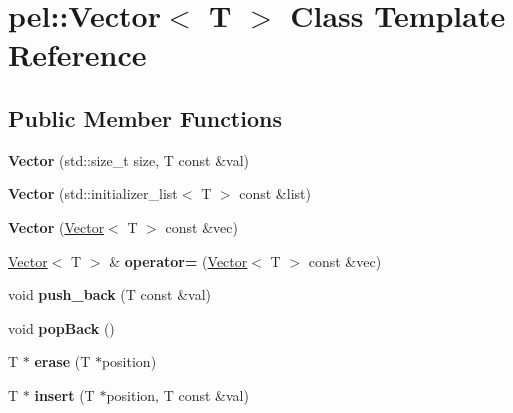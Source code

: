 \hypertarget{classpel_1_1Vector}{}\section{pel\+:\+:Vector$<$ T $>$ Class Template Reference}
\label{classpel_1_1Vector}
\subsection*{Public Member Functions}
\begin{DoxyCompactItemize}
\item 
\hypertarget{classpel_1_1Vector_acfca55ede1e52d9d559c87c1e6a7f4f0}{}{\bfseries Vector} (std\+::size\+\_\+t size, T const \&val)\label{classpel_1_1Vector_acfca55ede1e52d9d559c87c1e6a7f4f0}

\item 
\hypertarget{classpel_1_1Vector_a776cdcfda0eabf24d3cad2c57dee22e1}{}{\bfseries Vector} (std\+::initializer\+\_\+list$<$ T $>$ const \&list)\label{classpel_1_1Vector_a776cdcfda0eabf24d3cad2c57dee22e1}

\item 
\hypertarget{classpel_1_1Vector_ab8e71f6d59953f07233438634321600e}{}{\bfseries Vector} (\hyperlink{classpel_1_1Vector}{Vector}$<$ T $>$ const \&vec)\label{classpel_1_1Vector_ab8e71f6d59953f07233438634321600e}

\item 
\hypertarget{classpel_1_1Vector_a825f41c3a26e225eca6c904a22b1d193}{}\hyperlink{classpel_1_1Vector}{Vector}$<$ T $>$ \& {\bfseries operator=} (\hyperlink{classpel_1_1Vector}{Vector}$<$ T $>$ const \&vec)\label{classpel_1_1Vector_a825f41c3a26e225eca6c904a22b1d193}

\item 
\hypertarget{classpel_1_1Vector_aa05e5f15984153e3ee031f994604b72e}{}void {\bfseries push\+\_\+back} (T const \&val)\label{classpel_1_1Vector_aa05e5f15984153e3ee031f994604b72e}

\item 
\hypertarget{classpel_1_1Vector_a17be625421fc2dd77b0861748dbe5f27}{}void {\bfseries pop\+Back} ()\label{classpel_1_1Vector_a17be625421fc2dd77b0861748dbe5f27}

\item 
\hypertarget{classpel_1_1Vector_af6f1719719af509cbbee0b71245b0f00}{}T $\ast$ {\bfseries erase} (T $\ast$position)\label{classpel_1_1Vector_af6f1719719af509cbbee0b71245b0f00}

\item 
\hypertarget{classpel_1_1Vector_a59ce2f668870ee38146b19ef8a350aec}{}T $\ast$ {\bfseries insert} (T $\ast$position, T const \&val)\label{classpel_1_1Vector_a59ce2f668870ee38146b19ef8a350aec}


\end{DoxyCompactItemize}
